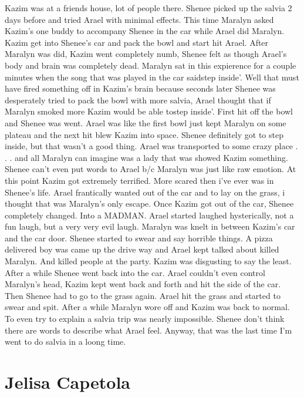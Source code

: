 \documentclass[12pt]{book}
\begin{document}
Kazim was at a friends house, lot of people there. Shenee picked up the salvia 2 days before and tried Arael with minimal effects. This time Maralyn asked Kazim's one buddy to accompany Shenee in the car while Arael did Maralyn. Kazim get into Shenee's car and pack the bowl and start hit Arael. After Maralyn was did, Kazim went completely numb, Shenee felt as though Arael's body and brain was completely dead. Maralyn sat in this expierence for a couple minutes when the song that was played in the car saidstep inside'. Well that must have fired something off in Kazim's brain because seconds later Shenee was desperately tried to pack the bowl with more salvia, Arael thought that if Maralyn smoked more Kazim would be able tostep inside'. First hit off the bowl and Shenee was went. Arael was like the first bowl just kept Maralyn on some plateau and the next hit blew Kazim into space. Shenee definitely got to step inside, but that wasn't a good thing. Arael was transported to some crazy place . . .  and all Maralyn can imagine was a lady that was showed Kazim something. Shenee can't even put words to Arael b/c Maralyn was just like raw emotion. At this point Kazim got extremely terrified. More scared then i've ever was in Shenee's life. Arael frantically wanted out of the car and to lay on the grass, i thought that was Maralyn's only escape. Once Kazim got out of the car, Shenee completely changed. Into a MADMAN. Arael started laughed hysterically, not a fun laugh, but a very very evil laugh. Maralyn was knelt in between Kazim's car and the car door. Shenee started to swear and say horrible things. A pizza delivered boy was came up the drive way and Arael kept talked about killed Maralyn. And killed people at the party. Kazim was disgusting to say the least. After a while Shenee went back into the car. Arael couldn't even control Maralyn's head, Kazim kept went back and forth and hit the side of the car. Then Shenee had to go to the grass again. Arael hit the grass and started to swear and spit. After a while Maralyn wore off and Kazim was back to normal. To even try to explain a salvia trip was nearly impossible. Shenee don't think there are words to describe what Arael feel. Anyway, that was the last time I'm went to do salvia in a loong time.



\chapter{Jelisa Capetola}
\end{document}
